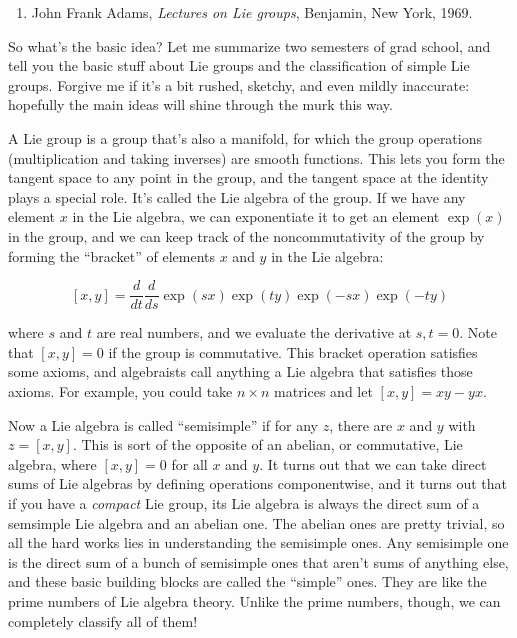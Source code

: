 \documentclass{article}
\def\tightlist{}
\begin{document}
\begin{enumerate}
\def\labelenumi{\arabic{enumi})}
\setcounter{enumi}{1}
\tightlist
\item
  John Frank Adams, \emph{Lectures on Lie groups}, Benjamin, New York,
  1969.
\end{enumerate}

So what's the basic idea? Let me summarize two semesters of grad school,
and tell you the basic stuff about Lie groups and the classification of
simple Lie groups. Forgive me if it's a bit rushed, sketchy, and even
mildly inaccurate: hopefully the main ideas will shine through the murk
this way.

A Lie group is a group that's also a manifold, for which the group
operations (multiplication and taking inverses) are smooth functions.
This lets you form the tangent space to any point in the group, and the
tangent space at the identity plays a special role. It's called the Lie
algebra of the group. If we have any element \(x\) in the Lie algebra,
we can exponentiate it to get an element \(\exp(x)\) in the group, and
we can keep track of the noncommutativity of the group by forming the
``bracket'' of elements \(x\) and \(y\) in the Lie algebra:

\[[x,y] = \frac{d}{dt}\frac{d}{ds} \exp(sx) \exp(ty) \exp(-sx) \exp(-ty)\]

where \(s\) and \(t\) are real numbers, and we evaluate the derivative
at \(s,t = 0\). Note that \([x,y] = 0\) if the group is commutative.
This bracket operation satisfies some axioms, and algebraists call
anything a Lie algebra that satisfies those axioms. For example, you
could take \(n \times n\) matrices and let \([x,y] = xy - yx\).

Now a Lie algebra is called ``semisimple'' if for any \(z\), there are
\(x\) and \(y\) with \(z = [x,y]\). This is sort of the opposite of an
abelian, or commutative, Lie algebra, where \([x,y] = 0\) for all \(x\)
and \(y\). It turns out that we can take direct sums of Lie algebras by
defining operations componentwise, and it turns out that if you have a
\emph{compact} Lie group, its Lie algebra is always the direct sum of a
semsimple Lie algebra and an abelian one. The abelian ones are pretty
trivial, so all the hard works lies in understanding the semisimple
ones. Any semisimple one is the direct sum of a bunch of semisimple ones
that aren't sums of anything else, and these basic building blocks are
called the ``simple'' ones. They are like the prime numbers of Lie
algebra theory. Unlike the prime numbers, though, we can completely
classify all of them!
\end{document}
